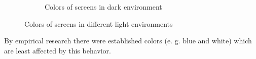 \begin{figure}[h]
\begin{subfigure}[b]{0.4\textwidth}
                \caption{Colors of screens in dark environment}
                \label{fig:mouse}
        \end{subfigure}
        \caption{Colors of screens in different light environments}\label{fig:screen_colors_in_enviroments}
\end{figure}
By empirical research there were established colors (e. g. blue and white) which are least affected by this behavior.